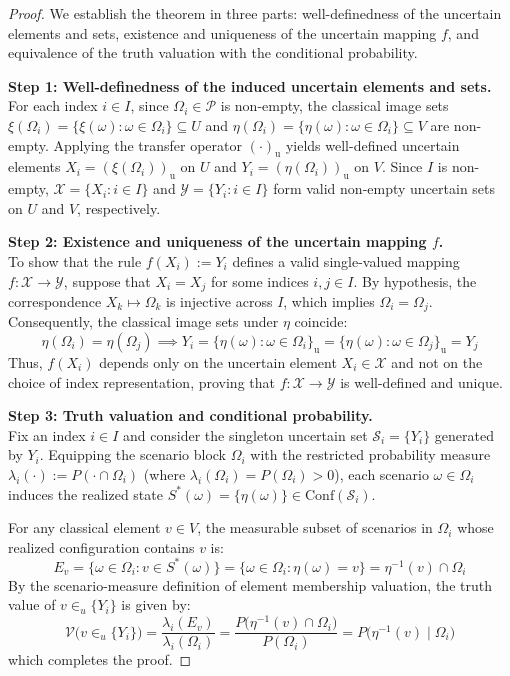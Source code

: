 \documentclass[a4paper,12pt, twoside]{memoir}
\newcommand{\tbd}[1]{\mathcal{#1}} %
\begin{document}
	\begin{proof}
		We establish the theorem in three parts: well-definedness of the uncertain elements and sets, existence and uniqueness of the uncertain mapping $f$, and equivalence of the truth valuation with the conditional probability.
		
		\textbf{Step 1: Well-definedness of the induced uncertain elements and sets.} \\
		For each index $i \in I$, since $\Omega_i \in \mathcal{P}$ is non-empty, the classical image sets $\xi(\Omega_i) = \{\xi(\omega) : \omega \in \Omega_i\} \subseteq U$ and $\eta(\Omega_i) = \{\eta(\omega) : \omega \in \Omega_i\} \subseteq V$ are non-empty. Applying the transfer operator $(\cdot)_\mathrm{u}$ yields well-defined uncertain elements $X_i = (\xi(\Omega_i))_\mathrm{u}$ on $U$ and $Y_i = (\eta(\Omega_i))_\mathrm{u}$ on $V$. Since $I$ is non-empty, $\tbd{X} = \{X_i : i \in I\}$ and $\tbd{Y} = \{Y_i : i \in I\}$ form valid non-empty uncertain sets on $U$ and $V$, respectively.
		
		\textbf{Step 2: Existence and uniqueness of the uncertain mapping $f$.} \\
		To show that the rule $f(X_i) := Y_i$ defines a valid single-valued mapping $f : \tbd{X} \to \tbd{Y}$, suppose that $X_i = X_j$ for some indices $i, j \in I$. By hypothesis, the correspondence $X_k \mapsto \Omega_k$ is injective across $I$, which implies $\Omega_i = \Omega_j$. Consequently, the classical image sets under $\eta$ coincide:
		\[
		\eta(\Omega_i) = \eta(\Omega_j) \implies Y_i = \big\{\eta(\omega) : \omega \in \Omega_i\big\}_\mathrm{u} = \big\{\eta(\omega) : \omega \in \Omega_j\big\}_\mathrm{u} = Y_j
		\]
		Thus, $f(X_i)$ depends only on the uncertain element $X_i \in \tbd{X}$ and not on the choice of index representation, proving that $f : \tbd{X} \to \tbd{Y}$ is well-defined and unique.
		
		\textbf{Step 3: Truth valuation and conditional probability.} \\
		Fix an index $i \in I$ and consider the singleton uncertain set $\tbd{S}_i = \{Y_i\}$ generated by $Y_i$. Equipping the scenario block $\Omega_i$ with the restricted probability measure $\lambda_i(\cdot) := P(\cdot \cap \Omega_i)$ (where $\lambda_i(\Omega_i) = P(\Omega_i) > 0$), each scenario $\omega \in \Omega_i$ induces the realized state $S^*(\omega) = \{\eta(\omega)\} \in \mathrm{Conf}(\tbd{S}_i)$. 
		
		For any classical element $v \in V$, the measurable subset of scenarios in $\Omega_i$ whose realized configuration contains $v$ is:
		\[
		E_v = \big\{ \omega \in \Omega_i : v \in S^*(\omega) \big\} = \big\{ \omega \in \Omega_i : \eta(\omega) = v \big\} = \eta^{-1}(v) \cap \Omega_i
		\]
		By the scenario-measure definition of element membership valuation, the truth value of $v \in_u \{Y_i\}$ is given by:
		\[
		\mathcal{V}\big(v \in_u \{Y_i\}\big) = \frac{\lambda_i(E_v)}{\lambda_i(\Omega_i)} = \frac{P\big(\eta^{-1}(v) \cap \Omega_i\big)}{P(\Omega_i)} = P\big(\eta^{-1}(v) \mid \Omega_i\big)
		\]
		which completes the proof.
	\end{proof}
\end{document}
